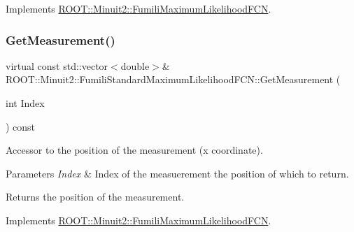 Implements \mbox{\hyperlink{classROOT_1_1Minuit2_1_1FumiliMaximumLikelihoodFCN_ac3e28c8d3e14a1df3145891ae99ac35d}{R\+O\+O\+T\+::\+Minuit2\+::\+Fumili\+Maximum\+Likelihood\+F\+CN}}.

\mbox{\label{classROOT_1_1Minuit2_1_1FumiliStandardMaximumLikelihoodFCN_a942bb66ec7d48d9ec0ea3d883dff7378}} 
\subsubsection{\texorpdfstring{GetMeasurement()}{GetMeasurement()}\hspace{0.1cm}{\footnotesize\ttfamily [3/3]}}
{\footnotesize\ttfamily virtual const std\+::vector$<$double$>$\& R\+O\+O\+T\+::\+Minuit2\+::\+Fumili\+Standard\+Maximum\+Likelihood\+F\+C\+N\+::\+Get\+Measurement (\begin{DoxyParamCaption}\item[{int}]{Index }\end{DoxyParamCaption}) const\hspace{0.3cm}{\ttfamily [virtual]}}

Accessor to the position of the measurement (x coordinate).


\begin{DoxyParams}{Parameters}
{\em Index} & Index of the measuerement the position of which to return.\\
\hline
\end{DoxyParams}
\begin{DoxyReturn}{Returns}
the position of the measurement. 
\end{DoxyReturn}


Implements \mbox{\hyperlink{classROOT_1_1Minuit2_1_1FumiliMaximumLikelihoodFCN_ac3e28c8d3e14a1df3145891ae99ac35d}{R\+O\+O\+T\+::\+Minuit2\+::\+Fumili\+Maximum\+Likelihood\+F\+CN}}.

\mbox{\label{classROOT_1_1Minuit2_1_1FumiliStandardMaximumLikelihoodFCN_a09175207d6c0ed94898f3985b4d376d2}} 
